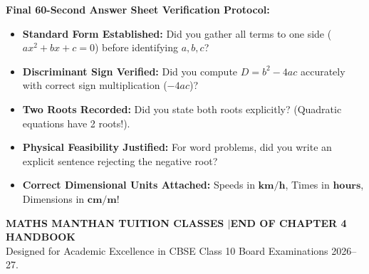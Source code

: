 \documentclass[10pt,a4paper]{article}
\begin{document}
\begin{successBox}[top=1.2mm,bottom=1.2mm,before skip=1.5pt,after skip=1pt]
  \textbf{Final 60-Second Answer Sheet Verification Protocol:}
  \begin{itemize}[leftmargin=4mm,itemsep=1pt,topsep=1pt,parsep=0pt]
    \item[$\square$] \textbf{Standard Form Established:} Did you gather all terms to one side ($ax^2 + bx + c = 0$) before identifying $a, b, c$?
    \item[$\square$] \textbf{Discriminant Sign Verified:} Did you compute $D = b^2 - 4ac$ accurately with correct sign multiplication ($-4ac$)?
    \item[$\square$] \textbf{Two Roots Recorded:} Did you state both roots explicitly? (Quadratic equations have 2 roots!).
    \item[$\square$] \textbf{Physical Feasibility Justified:} For word problems, did you write an explicit sentence rejecting the negative root?
    \item[$\square$] \textbf{Correct Dimensional Units Attached:} Speeds in $\mathbf{\text{km/h}}$, Times in $\mathbf{\text{hours}}$, Dimensions in $\mathbf{\text{cm} / \text{m}}$!
  \end{itemize}
\end{successBox}

\vfill
\begin{center}
  {\footnotesize\bfseries\color{primary}MATHS MANTHAN TUITION CLASSES \quad$\vert$\quad END OF CHAPTER 4 HANDBOOK}\\[1mm]
  {\scriptsize\color{secondary}Designed for Academic Excellence in CBSE Class 10 Board Examinations 2026--27.}
\end{center}
\end{document}
